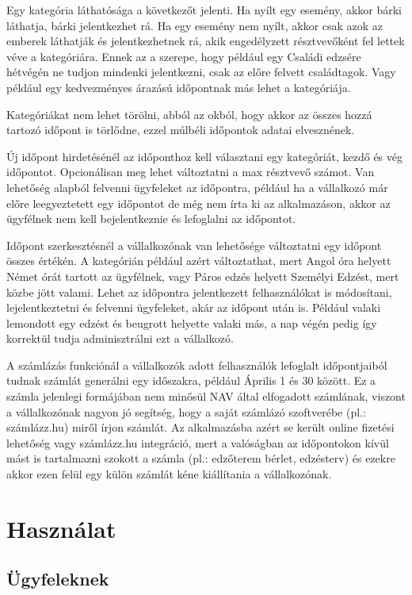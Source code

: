 Egy kategória láthatósága a következőt jelenti. Ha nyílt egy esemény, akkor bárki láthatja, bárki jelentkezhet rá. Ha egy esemény nem nyílt, akkor csak azok az emberek láthatják és jelentkezhetnek rá, akik engedélyzett résztvevőként fel lettek véve a kategóriára. Ennek az a szerepe, hogy például egy Családi edzsére hétvégén ne tudjon mindenki jelentkezni, csak az előre felvett családtagok. Vagy például egy kedvezményes árazású időpontnak más lehet a kategóriája.

Kategóriákat nem lehet törölni, abból az okból, hogy akkor az összes hozzá tartozó időpont is törlődne, ezzel múlbéli időpontok adatai elvesznének.

Új időpont hirdetésénél az időponthoz kell választani egy kategóriát, kezdő és vég időpontot. Opcionálisan meg lehet változtatni a max résztvevő számot. Van lehetőség alapból felvenni ügyfeleket az időpontra, például ha a vállalkozó már előre leegyeztetett egy időpontot de még nem írta ki az alkalmazáson, akkor az ügyfélnek nem kell bejelentkeznie és lefoglalni az időpontot.

Időpont szerkesztésnél a vállalkozónak van lehetősége változtatni egy időpont összes értékén. A kategórián például azért változtathat, mert Angol óra helyett Német órát tartott az ügyfélnek, vagy Páros edzés helyett Személyi Edzést, mert közbe jött valami. Lehet az időpontra jelentkezett felhasználókat is módosítani, lejelentkeztetni és felvenni ügyfeleket, akár az időpont után is. Például valaki lemondott egy edzést és beugrott helyette valaki más, a nap végén pedig így korrektül tudja adminisztrálni ezt a vállalkozó.

A számlázás funkciónál a vállalkozók adott felhasználók lefoglalt időpontjaiból tudnak számlát generálni egy időszakra, például Április 1 és 30 között. Ez a számla jelenlegi formájában nem minősül NAV által elfogadott számlának, viszont a vállalkozónak nagyon jó segítség, hogy a saját számlázó szoftverébe (pl.: számlázz.hu) miről írjon számlát. Az alkalmazásba azért se került online fizetési lehetőség vagy számlázz.hu integráció, mert a valóságban az időpontokon kívül mást is tartalmazni szokott a számla (pl.: edzőterem bérlet, edzésterv) és ezekre akkor ezen felül egy külön számlát kéne kiállítania a vállalkozónak.

\section{Használat}
\subsection{Ügyfeleknek}

